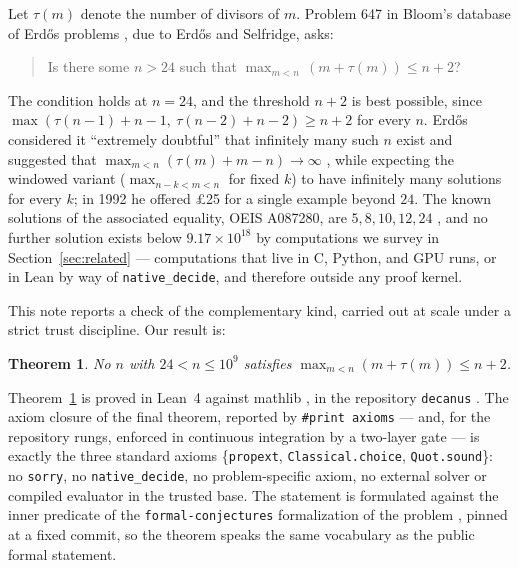 \documentclass[11pt]{article}
\newtheorem{theorem}{Theorem}[section]
\newcommand{\tdiv}{\tau}
\newcommand{\lean}[1]{\texttt{#1}}
\begin{document}
Let $\tdiv(m)$ denote the number of divisors of $m$. Problem 647 in
Bloom's database of Erd\H{o}s problems \cite{bloom647}, due to Erd\H{o}s
and Selfridge, asks:
\begin{quote}
Is there some $n > 24$ such that
$\max_{m<n}\,(m + \tdiv(m)) \le n + 2$?
\end{quote}
The condition holds at $n = 24$, and the threshold $n+2$ is best
possible, since $\max(\tdiv(n-1)+n-1,\ \tdiv(n-2)+n-2) \ge n+2$ for
every $n$. Erd\H{o}s considered it ``extremely doubtful'' that
infinitely many such $n$ exist and suggested that
$\max_{m<n}(\tdiv(m)+m-n) \to \infty$ \cite{erdos79}, while expecting
the windowed variant ($\max_{n-k<m<n}$ for fixed $k$) to have infinitely
many solutions for every $k$; in 1992 he offered \pounds 25 for a single
example beyond $24$. The known solutions of the associated equality,
OEIS A087280, are $5, 8, 10, 12, 24$ \cite{oeisA087280}, and no further
solution exists below $9.17 \times 10^{18}$ by computations we survey in
Section~\ref{sec:related} --- computations that live in C, Python, and
GPU runs, or in Lean by way of \lean{native\_decide}, and therefore
outside any proof kernel.

This note reports a check of the complementary kind, carried out at
scale under a strict trust discipline. Our result is:

\begin{theorem}\label{thm:main}
No $n$ with $24 < n \le 10^9$ satisfies
$\max_{m<n}(m + \tdiv(m)) \le n + 2$.
\end{theorem}

Theorem~\ref{thm:main} is proved in Lean~4 \cite{lean4} against mathlib
\cite{mathlib}, in the repository \lean{decanus} \cite{decanus}. The
axiom closure of the final theorem, reported by \verb|#print axioms| ---
and, for the repository rungs, enforced in continuous integration by a
two-layer gate --- is exactly the three standard axioms
\{\lean{propext}, \lean{Classical.choice}, \lean{Quot.sound}\}: no
\lean{sorry}, no \lean{native\_decide}, no problem-specific axiom, no
external solver or compiled evaluator in the trusted base. The statement
is formulated against the inner predicate of the
\lean{formal-conjectures} formalization of the problem
\cite{formalconjectures}, pinned at a fixed commit, so the theorem
speaks the same vocabulary as the public formal statement.
\end{document}
